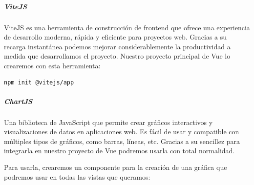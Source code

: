 \subparagraph{ViteJS}
ViteJS es una herramienta de construcción de frontend que ofrece una experiencia de desarrollo moderna, rápida y eficiente para proyectos web.
Gracias a su recarga instantánea podemos mejorar considerablemente la productividad a medida que desarrollamos el proyecto. Nuestro proyecto principal de Vue lo crearemos con esta herramienta:

\begin{lstlisting}[style=Consola, caption={Instalación del paquete iconify},label=Consola_code]
	npm init @vitejs/app
\end{lstlisting}

\subparagraph{ChartJS}
Una biblioteca de JavaScript que permite crear gráficos interactivos y visualizaciones de datos en aplicaciones web. Es fácil de usar y compatible con múltiples tipos de gráficos, como barras, líneas, etc. Gracias a su sencillez para integrarla en nuestro proyecto de Vue podremos usarla con total normalidad.

Para usarla, crearemos un componente para la creación de una gráfica que podremos usar en todas las vistas que queramos:

